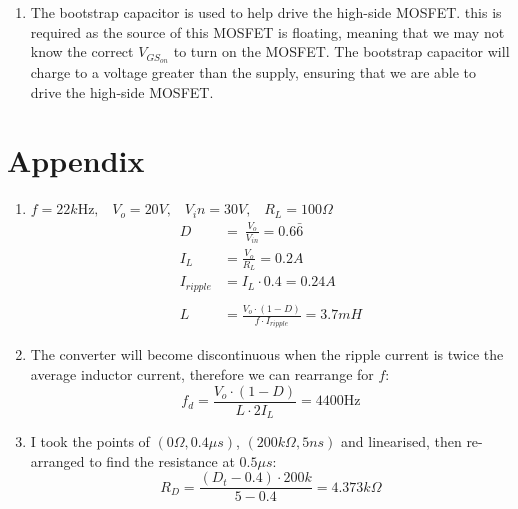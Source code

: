 \documentclass[a4paper,11pt]{article}
\begin{document}
\begin{preview}
\begin{enumerate}
    \item The bootstrap capacitor is used to help drive the high-side MOSFET. this is required as the source of this MOSFET is floating, meaning that we may not know the correct $V_{GS_{on}}$ to turn on the MOSFET. The bootstrap capacitor will charge to a voltage greater than the supply, ensuring that we are able to drive the high-side MOSFET.

\end{enumerate}

\section*{Appendix}

\begin{enumerate}
  \item $ f = 22k\mathrm{Hz}, \;\;\; V_o = 20V, \;\;\; V_in=30V, \;\;\; R_L=100\Omega $
  \begin{align*}
    D\ &=\ \frac{V_{o}}{V_{in}} = 0.6\bar{6}\\
    I_{L}&=\frac{V_{o}}{R_{L}} = 0.2A\\
    I_{ripple}&=I_{L}\cdot0.4 = 0.24A\\\\
    L&=\frac{V_{o}\cdot\left(1-D\right)}{f\cdot I_{ripple}} = 3.7mH
  \end{align*}

  \item The converter will become discontinuous when the ripple current is twice the average inductor current, therefore we can rearrange for $f$:
  $$ f_{d}=\frac{V_{o}\cdot\left(1-D\right)}{L\cdot2I_{L}} = 4400\mathrm{Hz}$$

  \item I took the points of $(0\Omega , 0.4\mu s)$, $(200k\Omega , 5ns)$ and linearised, then re-arranged to find the resistance at $0.5\mu s$:
  $$ R_{D}=\frac{\left(D_{t}-0.4\right)\cdot200k}{5-0.4} = 4.373k\Omega$$
\end{enumerate}


\end{preview}
\end{document}
